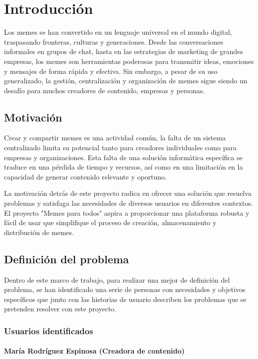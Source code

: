 \chapter{Introducción}

Los memes se han convertido en un lenguaje universal en el mundo digital, traspasando fronteras, culturas y generaciones. Desde las conversaciones informales en grupos de chat, hasta en las estrategias de marketing de grandes empresas, los memes son herramientas poderosas para transmitir ideas, emociones y mensajes de forma rápida y efectiva. Sin embargo, a pesar de su uso generalizado, la gestión, centralización y organización de memes sigue siendo un desafío para muchos creadores de contenido, empresas y personas.

\section{Motivación}

Crear y compartir memes es una actividad común, la falta de un sistema centralizado limita su potencial tanto para creadores individuales como para empresas y organizaciones. Esta falta de una solución informática específica se traduce en una pérdida de tiempo y recursos, así como en una limitación en la capacidad de generar contenido relevante y oportuno.

La motivación detrás de este proyecto radica en ofrecer una solución que resuelva problemas y satisfaga las necesidades de diversos usuarios en diferentes contextos. El proyecto "Memes para todos" aspira a proporcionar una plataforma robusta y fácil de usar que simplifique el proceso de creación, almacenamiento y distribución de memes.

\section{Definición del problema}

Dentro de este marco de trabajo, para realizar una mejor de definición del problema, se han identificado una serie de personas con necesidades y objetivos específicos que junto con las historias de usuario describen los problemas que se pretenden resolver con este proyecto.

\subsection{Usuarios identificados}

    \subsubsection{María Rodríguez Espinosa (Creadora de contenido)}

